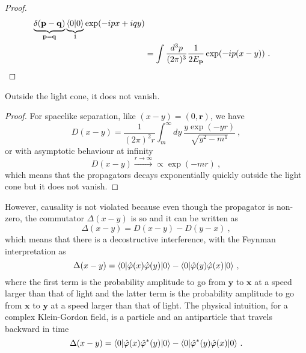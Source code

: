 \begin{proof}
\begin{equation*}
\begin{aligned}
            \underbrace{\delta (\mathbf p - \mathbf q)}_{\mathbf p = \mathbf q} \underbrace{\langle0\vert0\rangle}_1 \exp (- i p x + i q y) \\ & = \int \frac{d^3 p}{(2\pi)^3} \frac{1}{2 E_{\mathbf p}} \exp (- i p (x-y)) ~.
        \end{aligned}
        \end{equation*}
    \end{proof}

    Outside the light cone, it does not vanish.
    \begin{proof}
        For spacelike separation, like $(x-y) = (0, \mathbf r)$, we have 
        \begin{equation*}
            D(x-y) = \frac{1}{(2\pi)^2 r} \int_m^\infty dy ~ \frac{y \exp(- yr)}{\sqrt{y^2 - m^1}} ~,
        \end{equation*}
        or with asymptotic behaviour at infinity 
        \begin{equation*}
            D(x-y) \xrightarrow{r \rightarrow \infty} \propto \exp(-mr) ~,
        \end{equation*}
        which means that the propagators decays exponentially quickly outside the light cone but it does not vanish.
    \end{proof}

    However, causality is not violated because even though the propagator is non-zero, the commutator $\Delta (x-y)$ is so and it can be written as 
    \begin{equation*}
        \Delta (x-y) = D(x-y) - D(y-x) ~,
    \end{equation*}
    which means that there is a decostructive interference, with the Feynman interpretation as 
    \begin{equation*}
        \Delta (x-y) = \langle0\vert \hat \varphi (x) \hat \varphi (y) \vert0\rangle - \langle0\vert \hat \varphi (y) \hat \varphi (x) \vert0\rangle ~,
    \end{equation*}
    where the first term is the probability amplitude to go from $\mathbf y$ to $\mathbf x$ at a speed larger than that of light and the latter term is the probability amplitude to go from $\mathbf x$ to $\mathbf y$ at a speed larger than that of light. The physical intuition, for a complex Klein-Gordon field, is a particle and an antiparticle that travels backward in time
    \begin{equation*}
        \Delta (x-y) = \langle0\vert \hat \varphi (x) \hat \varphi^* (y) \vert0\rangle - \langle0\vert \hat \varphi^* (y) \hat \varphi (x) \vert0\rangle ~.
    \end{equation*} 
    
    
    
